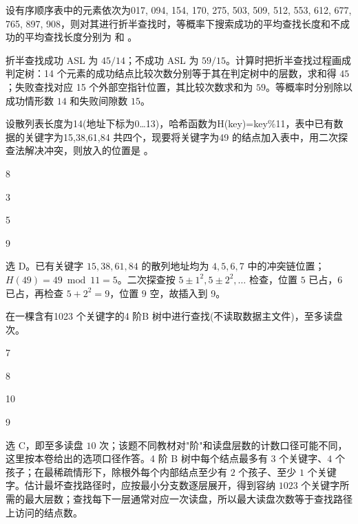 \begin{question}
设有序顺序表中的元素依次为017, 094, 154, 170, 275, 503, 509, 512, 553, 612, 677, 765, 897, 908，则对其进行折半查找时，等概率下搜索成功的平均查找长度和不成功的平均查找长度分别为 \blank 和 \blank。
\begin{solution}
折半查找成功 ASL 为 $45/14$；不成功 ASL 为 $59/15$。计算时把折半查找过程画成判定树：14 个元素的成功结点比较次数分别等于其在判定树中的层数，求和得 $45$；失败查找对应 15 个外部空指针位置，其比较次数求和为 $59$。等概率时分别除以成功情形数 $14$ 和失败间隙数 $15$。
\end{solution}
\end{question}

\begin{question}
设散列表长度为14(地址下标为0…13)，哈希函数为H(key)=key\%11，表中已有数据的关键字为15,38,61,84 共四个，现要将关键字为49 的结点加入表中，用二次探查法解决冲突，则放入的位置是 \blank。
\begin{choiceoptions}[2]
  \item 8
  \item 3
  \item 5
  \item 9
\end{choiceoptions}
\begin{solution}
选 D。已有关键字 $15,38,61,84$ 的散列地址均为 $4,5,6,7$ 中的冲突链位置；$H(49)=49\bmod 11=5$。二次探查按 $5\pm1^2,5\pm2^2,\ldots$ 检查，位置 $5$ 已占，$6$ 已占，再检查 $5+2^2=9$，位置 $9$ 空，故插入到 9。
\end{solution}
\end{question}

\begin{question}
在一棵含有1023 个关键字的4 阶B 树中进行查找(不读取数据主文件)，至多读盘 \blank 次。
\begin{choiceoptions}[2]
  \item 7
  \item 8
  \item 10
  \item 9
\end{choiceoptions}
\begin{solution}
选 C，即至多读盘 $10$ 次；该题不同教材对"阶"和读盘层数的计数口径可能不同，这里按本卷给出的选项口径作答。4 阶 B 树中每个结点最多有 $3$ 个关键字、$4$ 个孩子；在最稀疏情形下，除根外每个内部结点至少有 $2$ 个孩子、至少 $1$ 个关键字。估计最坏查找路径时，应按最小分支数逐层展开，得到容纳 $1023$ 个关键字所需的最大层数；查找每下一层通常对应一次读盘，所以最大读盘次数等于查找路径上访问的结点数。
\end{solution}
\end{question}

